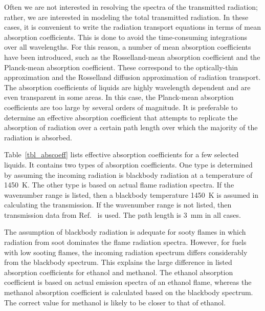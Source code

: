 Often we are not interested in resolving the spectra of the transmitted radiation; rather, we are interested in modeling the total transmitted radiation. In these cases, it is convenient to write the radiation transport equations in terms of mean absorption coefficients. This is done to avoid the time-consuming integrations over all wavelengths. For this reason, a number of mean absorption coefficients have been introduced, such as the Rosselland-mean absorption coefficient and the Planck-mean absorption coefficient. These correspond to the optically-thin approximation and the Rosselland diffusion approximation of radiation transport. The absorption coefficients of liquids are highly wavelength dependent and are even transparent in some areas. In this case, the Planck-mean absorption coefficients are too large by several orders of magnitude. It is preferable to determine an effective absorption coefficient that attempts to replicate the absorption of radiation over a certain path length over which the majority of the radiation is absorbed.

Table~\ref{tbl_abscoeff} lists effective absorption coefficients for a few selected liquids. It contains two types of absorption coefficients. One type is determined by assuming the incoming radiation is blackbody radiation at a temperature of 1450~K. The other type is based on actual flame radiation spectra. If the wavenumber range is listed, then a blackbody temperature 1450~K is assumed in calculating the transmission. If the wavenumber range is not listed, then transmission data from Ref.~\cite{Suo-Anttila:PCT2009} is used. The path length is \SI{3}{\milli m} in all cases.

The assumption of blackbody radiation is adequate for sooty flames in which radiation from soot dominates the flame radiation spectra. However, for fuels with low sooting flames, the incoming radiation spectrum differs considerably from the blackbody spectrum. This explains the large difference in listed absorption coefficients for ethanol and methanol. The ethanol absorption coefficient is based on actual emission spectra of an ethanol flame, whereas the methanol absorption coefficient is calculated based on the blackbody spectrum. The correct value for methanol is likely to be closer to that of ethanol.

